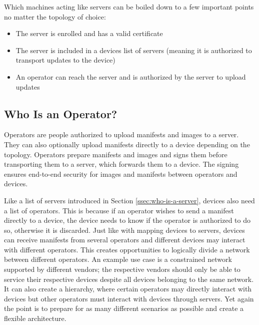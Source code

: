 \documentclass[0-thesis.tex]{subfiles}
\begin{document}
Which machines acting like servers can be boiled down to a few important points no matter
the topology of choice:

\begin{itemize}
    \item The server is enrolled and has a valid certificate
    \item The server is included in a devices list of servers (meaning it is authorized to
            transport updates to the device)
    \item An operator can reach the server and is authorized by the server to upload updates
\end{itemize}

\subsection{Who Is an Operator?}
\label{ssec:who-is-an-operator}
Operators are people authorized to upload manifests and images to a server. They can also
optionally upload manifests directly to a device depending on the topology. Operators
prepare manifests and images and signs them before transporting them to a server, which
forwards them to a device. The signing ensures end-to-end security for images and
manifests between operators and devices.

Like a list of servers introduced in Section \ref{ssec:who-is-a-server}, devices also need
a list of operators. This is because if an operator wishes to send a manifest directly to
a device, the device needs to know if the operator is authorized to do so, otherwise it is
discarded. Just like with mapping devices to servers, devices can receive manifests from
several operators and different devices may interact with different operators. This
creates opportunities to logically divide a network between different operators. An
example use case is a constrained network supported by different vendors; the respective
vendors should only be able to service their respective devices despite all devices
belonging to the same network. It can also create a hierarchy, where certain operators may
directly interact with devices but other operators must interact with devices through
servers. Yet again the point is to prepare for as many different scenarios as possible and
create a flexible architecture.
\end{document}
